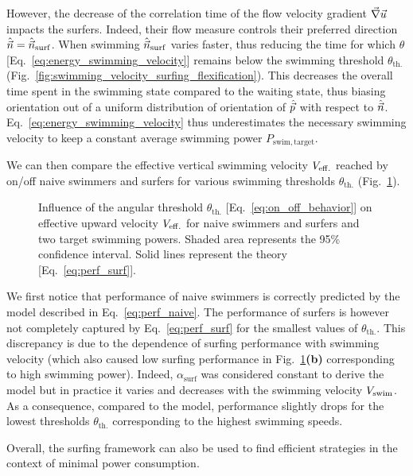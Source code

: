 However, the decrease of the correlation time of the flow velocity gradient $\vec{\nabla} \vec{u}$ impacts the surfers.
Indeed, their flow measure controls their preferred direction $\hat{\vec{n}} = \hat{\vec{n}}_{\mathrm{surf}}$.
When swimming $\hat{\vec{n}}_{\mathrm{surf}}$ varies faster, thus reducing the time for which $\theta$ [Eq.~\eqref{eq:energy_swimming_velocity}] remains below the swimming threshold $\theta_{\mathrm{th.}}$ (Fig.~\ref{fig:swimming_velocity_surfing_flexification}).
This decreases the overall time spent in the swimming state compared to the waiting state, thus biasing orientation out of a uniform distribution of orientation of $\hat{\vec{p}}$ with respect to $\hat{\vec{n}}$.
Eq.~\eqref{eq:energy_swimming_velocity} thus underestimates the necessary swimming velocity to keep a constant average swimming power $P_{\mathrm{swim}, \mathrm{target}}$.

We can then compare the effective vertical swimming velocity $V_{\mathrm{eff.}}$ reached by on/off naive swimmers and surfers for various swimming thresholds $\theta_{\mathrm{th.}}$ (Fig.~\ref{fig:energy_efficiency_threshold}).
\begin{figure}%
	\centering
	
	\caption[Influence of the angular threshold on effective upward velocity.]{
		Influence of the angular threshold $\theta_{\mathrm{th.}}$ [Eq.~\eqref{eq:on_off_behavior}] on effective upward velocity $V_{\mathrm{eff.}}$ for naive swimmers and surfers and two target swimming powers.
		Shaded area represents the 95\% confidence interval.
		Solid lines represent the theory [Eq.~\eqref{eq:perf_surf}].
	}
	\label{fig:energy_efficiency_threshold}
\end{figure}
We first notice that performance of naive swimmers is correctly predicted by the model described in Eq.~\eqref{eq:perf_naive}.
The performance of surfers is however not completely captured by Eq.~\eqref{eq:perf_surf} for the smallest values of $\theta_{\mathrm{th.}}$.
This discrepancy is due to the dependence of surfing performance with swimming velocity (which also caused low surfing performance in Fig.~\ref{fig:energy_efficiency_threshold}\textbf{(b)} corresponding to high swimming power).
Indeed, $\alpha_{\mathrm{surf}}$ was considered constant to derive the model but in practice it varies and decreases with the swimming velocity $V_{\mathrm{swim}}$.
As a consequence, compared to the model, performance slightly drops for the lowest thresholds $\theta_{\mathrm{th.}}$ corresponding to the highest swimming speeds.

Overall, the surfing framework can also be used to find efficient strategies in the context of minimal power consumption.
